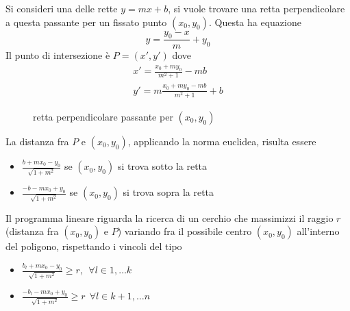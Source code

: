 \documentclass[10pt, letterpaper]{report}
\begin{document}
Si consideri una delle rette $y=mx+b$, si vuole trovare una retta perpendicolare a questa passante per un fissato punto $(x_0,y_0)$. Questa ha equazione 
$$y=\frac{y_0-x}{m}+y_0 $$
Il punto di intersezione è $P=(x',y')$ dove 
\begin{eqnarray}
    x'=\frac{x_0+my_0}{m^2+1}-mb\\ 
    y'=m\frac{x_0+my_0-mb}{m^2+1}+b
\end{eqnarray}
\begin{figure}[h]
    \caption{retta perpendicolare passante per $(x_0,y_0)$}
\end{figure}
La distanza fra $P$ e $(x_0,y_0)$, applicando la norma euclidea, risulta essere 
\begin{itemize}
    \item $\displaystyle\frac{b+mx_0-y_0}{\sqrt{1+m^2}}$ se $(x_0,y_0)$ si trova sotto la retta 
    \item $\displaystyle\frac{-b-mx_0+y_0}{\sqrt{1+m^2}}$ se $(x_0,y_0)$ si trova sopra la retta 
\end{itemize}
Il programma lineare riguarda la ricerca di un cerchio che massimizzi il raggio $r$ (distanza fra $(x_0,y_0)$ e $P$) variando fra il possibile centro $(x_0,y_0)$ all'interno del poligono, rispettando i vincoli del tipo 
\begin{itemize}
     \item$\frac{b_l+mx_0-y_0}{\sqrt{1+m^2}}\ge r, \ \ \forall  l \in {1,\dots k}$
     \item$\frac{-b_l-mx_0+y_0}{\sqrt{1+m^2}}\ge r\ \ \forall l \in {k+1,\dots n}$
\end{itemize} 
\end{document}
